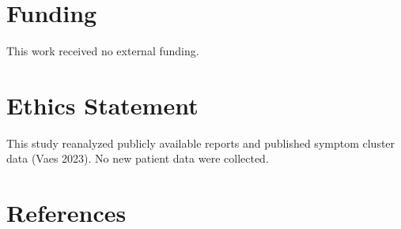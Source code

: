 \documentclass[
  letterpaper,
  DIV=11,
  numbers=noendperiod]{scrartcl}
\begin{document}
\section*{Funding}\label{funding}

This work received no external funding.

\section*{Ethics Statement}\label{ethics-statement}

This study reanalyzed publicly available reports and published symptom
cluster data (Vaes 2023). No new patient data were collected.

\newpage{}

\section*{References}\label{references}
\end{document}
